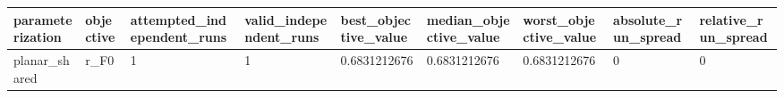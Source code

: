 \begin{tabular}{@{}lllllllll@{}}
\toprule
parameterization & objective & attempted\_independent\_runs & valid\_independent\_runs & best\_objective\_value & median\_objective\_value & worst\_objective\_value & absolute\_run\_spread & relative\_run\_spread \\
\midrule
planar\_shared & r\_F0 & 1 & 1 & 0.6831212676 & 0.6831212676 & 0.6831212676 & 0 & 0 \\
\bottomrule
\end{tabular}
